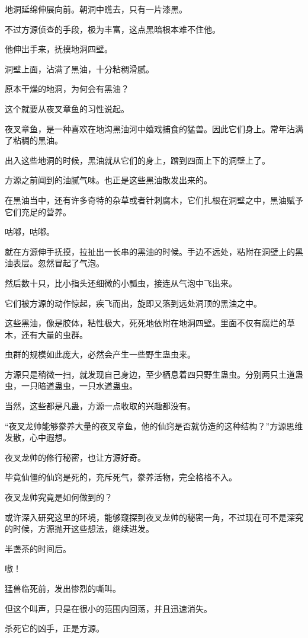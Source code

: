 \begin{this_body}
地洞延绵伸展向前。朝洞中瞧去，只有一片漆黑。

不过方源侦查的手段，极为丰富，这点黑暗根本难不住他。

他伸出手来，抚摸地洞四壁。

洞壁上面，沾满了黑油，十分粘稠滑腻。

原本干燥的地洞，为何会有黑油？

这个就要从夜叉章鱼的习性说起。

夜叉章鱼，是一种喜欢在地沟黑油河中嬉戏捕食的猛兽。因此它们身上。常年沾满了粘稠的黑油。

出入这些地洞的时候，黑油就从它们的身上，蹭到四面上下的洞壁上了。

方源之前闻到的油腻气味。也正是这些黑油散发出来的。

在黑油当中，还有许多奇特的杂草或者针刺腐木，它们扎根在洞壁之中，黑油赋予它们充足的营养。

咕嘟，咕嘟。

就在方源伸手抚摸，拉扯出一长串的黑油的时候。手边不远处，粘附在洞壁上的黑油表层。忽然冒起了气泡。

然后数十只，比小指头还细微的小瓢虫，接连从气泡中飞出来。

它们被方源的动作惊起，疾飞而出，旋即又落到远处洞顶的黑油之中。

这些黑油，像是胶体，粘性极大，死死地依附在地洞四壁。里面不仅有腐烂的草木，还有大量的虫群。

虫群的规模如此庞大，必然会产生一些野生蛊虫来。

方源只是稍微一扫，就发现自己身边，至少栖息着四只野生蛊虫。分别两只土道蛊虫，一只暗道蛊虫，一只水道蛊虫。

当然，这些都是凡蛊，方源一点收取的兴趣都没有。

“夜叉龙帅能够豢养大量的夜叉章鱼，他的仙窍是否就仿造的这种结构？”方源思维发散，心中遐想。

夜叉龙帅的修行秘密，也让方源好奇。

毕竟仙僵的仙窍是死的，充斥死气，豢养活物，完全格格不入。

夜叉龙帅究竟是如何做到的？

或许深入研究这里的环境，能够窥探到夜叉龙帅的秘密一角，不过现在可不是深究的时候，方源抛开这些想法，继续进发。

半盏茶的时间后。

嗷！

猛兽临死前，发出惨烈的嘶叫。

但这个叫声，只是在很小的范围内回荡，并且迅速消失。

杀死它的凶手，正是方源。


\end{this_body}
